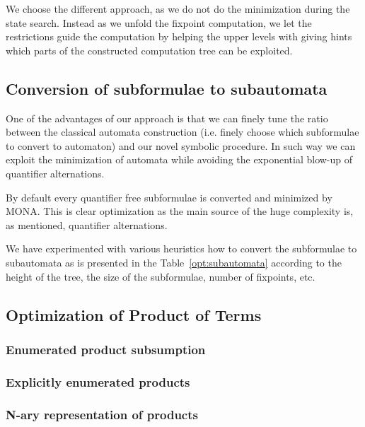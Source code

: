   We choose the different approach, as we do not do the minimization
  during the state search. Instead as we unfold the fixpoint 
  computation, we let the restrictions guide the computation by
  helping the upper levels with giving hints which parts of the
  constructed computation tree can be exploited.

  \subsection{Conversion of subformulae to subautomata}
  
  One of the advantages of our approach is that we can finely tune
  the ratio between the classical automata construction (i.e. finely
  choose which subformulae to convert to automaton) and our novel
  symbolic procedure. In such way we can exploit the minimization
  of automata while avoiding the exponential blow-up of quantifier
  alternations.
  
  By default every quantifier free subformulae is converted and
  minimized by MONA. This is clear optimization as the main source
  of the huge complexity is, as mentioned, quantifier alternations.
  
  We have experimented with various heuristics how to convert the
  subformulae to subautomata as is presented in the
  Table~\ref{opt:subautomata} according to the height of the tree, 
  the size of the subformulae, number of fixpoints, etc.
  
  \subsection{Optimization of Product of Terms}
  
  \subsubsection{Enumerated product subsumption}
  
  \subsubsection{Explicitly enumerated products}
  
  \subsubsection{N-ary representation of products}

